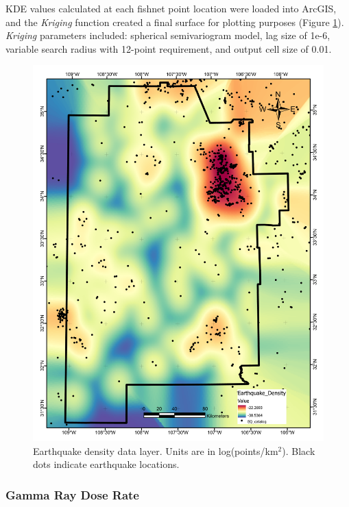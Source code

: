KDE values calculated at each fishnet point location were loaded into ArcGIS, and the \textit{Kriging} function created a final surface for plotting purposes (Figure \ref{fig:feat_EQ_density}). \textit{Kriging} parameters included: spherical semivariogram model, lag size of 1e-6, variable search radius with 12-point requirement, and output cell size of 0.01.

\begin{figure}[!htp]
\centering
\includegraphics[scale=.50]{templates/images/Figure-EarthquakeDensity.pdf}
\caption[Earthquake density data layer]{Earthquake density data layer. Units are in log(points/km$^2$). Black dots indicate earthquake locations.}
\label{fig:feat_EQ_density}
\end{figure}

\subsubsection{Gamma Ray Dose Rate}

